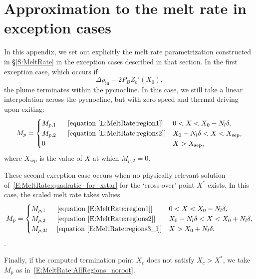\documentclass{jfm}
\newcommand{\Pb}{\textit{P}_B}  %
\newcommand{\lt}{\delta} %
\renewcommand{\in}{\text{in}} %
\begin{document}
\section{Approximation to the melt rate in exception cases}\label{A:ExceptionCases}
In this appendix, we set out explicitly the melt rate parametrization constructed in \S\ref{S:MeltRate} in the exception cases described in that section. In the first exception case, which occurs if
\begin{equation}
\Delta \rho_{\in} - 2 \Pb Z_b'(X_0),
\end{equation}
the plume terminates within the pycnocline. In this case, we still take a linear interpolation across the pycnocline, but with zero speed and thermal driving upon exiting:
\begin{equation}
M_{p} = \begin{cases} 
M_{p,1~} \text{~\quad [equation~\eqref{E:MeltRate:region1}]}  & 0 < X < X_0 - N_l \lt,\\
M_{p,2~} \text{~\quad [equation~\eqref{E:MeltRate:regions2}]} & X_0 - N_l \lt < X <X_{\text{sep}} ,\\
0  &  X > X_{\text{sep}},\\
\end{cases}
\end{equation}
where $X_{\text{sep}}$ is the value of $X$ at which $M_{p,2} = 0$.

These second exception case occurs when no physically relevant solution of~\eqref{E:MeltRate:quadratic_for_xstar} for the `cross-over' point $X^*$ exists. In this case,  the scaled melt rate takes values
\begin{equation}\label{E:MeltRate:AllRegions_noroot}
M_{p} = \begin{cases} 
M_{p,1~} \text{~\quad [equation~\eqref{E:MeltRate:region1}]}  & 0 < X < X_0 - N_l \lt,\\
M_{p,2~} \text{~\quad [equation~\eqref{E:MeltRate:regions2}]} & X_0 - N_l \lt < X < X_0 + N_l \lt,\\
M_{p,3l~} \text{\quad [equation~\eqref{E:MeltRate:regions3_l}]} &  X > X_0 + N_l \lt.
\end{cases}
\end{equation}.

Finally, if the computed termination point $X_c$ does not satisfy $X_c > X^*$, we take $M_p$ as in~\eqref{E:MeltRate:AllRegions_noroot}.




\end{document}
